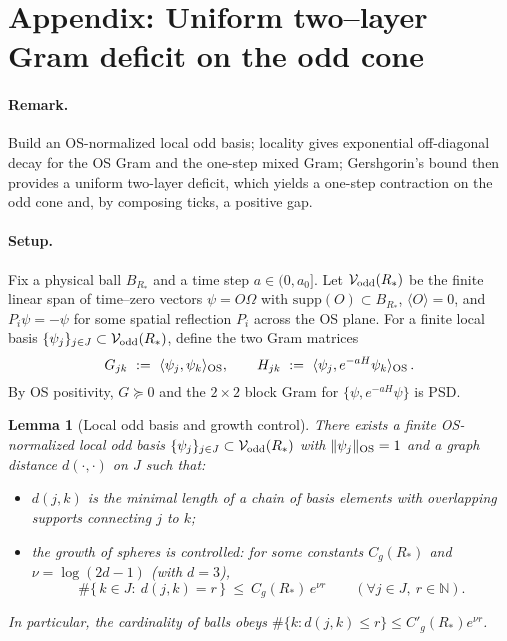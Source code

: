 \documentclass[11pt]{amsart}
\theoremstyle{plain}
\newtheorem{lemma}[theorem]{Lemma}
\theoremstyle{definition}
\theoremstyle{remark}
\begin{document}
\section{Appendix: Uniform two--layer Gram deficit on the odd cone}

\paragraph{Remark.} Build an OS-normalized local odd basis; locality gives exponential off-diagonal decay for the OS Gram and the one-step mixed Gram; Gershgorin's bound then provides a uniform two-layer deficit, which yields a one-step contraction on the odd cone and, by composing ticks, a positive gap.

\paragraph{Setup.}
Fix a physical ball $B_{R_*}$ and a time step $a\in(0,a_0]$. Let $\mathcal{V}_{\rm odd}(R_*)$ be the finite linear span of time--zero vectors $\psi=O\Omega$ with $\mathrm{supp}(O)\subset B_{R_*}$, $\langle O\rangle=0$, and $P_i\psi=-\psi$ for some spatial reflection $P_i$ across the OS plane. For a finite local basis $\{\psi_j\}_{j\in J}\subset \mathcal{V}_{\rm odd}(R_*)$, define the two Gram matrices
\[
  G_{jk}\ :=\ \langle\psi_j,\psi_k\rangle_{\rm OS},\qquad
  H_{jk}\ :=\ \langle\psi_j, e^{-aH}\psi_k\rangle_{\rm OS}\,.
\]
By OS positivity, $G\succeq 0$ and the $2\times 2$ block Gram for $\{\psi, e^{-aH}\psi\}$ is PSD.

\begin{lemma}[Local odd basis and growth control]\label{lem:local-basis-growth}
There exists a finite OS-normalized local odd basis $\{\psi_j\}_{j\in J}\subset \mathcal{V}_{\rm odd}(R_*)$ with $\|\psi_j\|_{\rm OS}=1$ and a graph distance $d(\cdot,\cdot)$ on $J$ such that:
\begin{itemize}
  \item[(i)] $d(j,k)$ is the minimal length of a chain of basis elements with overlapping supports connecting $j$ to $k$;
  \item[(ii)] the growth of spheres is controlled: for some constants $C_g(R_*)$ and $\nu=\log(2d-1)$ (with $d=3$),
  \[
    \#\{\,k\in J:\ d(j,k)=r\,\}\ \le\ C_g(R_*)\,e^{\nu r}\qquad(\forall j\in J,\ r\in\mathbb N).
  \]
\end{itemize}
In particular, the cardinality of balls obeys $\#\{k: d(j,k)\le r\}\le C'_g(R_*) e^{\nu r}$.
\end{lemma}
\end{document}
